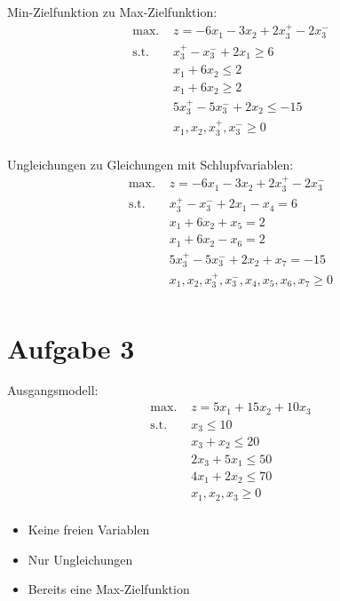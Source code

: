 \documentclass[a4paper,11pt]{article}
\begin{document}
Min-Zielfunktion zu Max-Zielfunktion:
\begin{align*}
    \text{max. } & z = -6x_{1} - 3x_{2} + 2x_{3}^{+} - 2x_{3}^{-}\\
    \text{s.t. } & x_{3}^{+} - x_{3}^{-} + 2x_{1} \ge 6 \\
    & x_{1} + 6x_{2} \le 2 \\
    & x_{1} + 6x_{2} \ge 2 \\
    & 5x_{3}^{+} - 5x_{3}^{-} + 2x_{2} \le -15 \\
    & x_{1}, x_{2}, x_{3}^{+}, x_{3}^{-} \ge 0 \\
\end{align*}

Ungleichungen zu Gleichungen mit Schlupfvariablen:
\begin{align*}
    \text{max. } & z = -6x_{1} - 3x_{2} + 2x_{3}^{+} - 2x_{3}^{-}\\
    \text{s.t. } & x_{3}^{+} - x_{3}^{-} + 2x_{1} - x_{4} = 6 \\
    & x_{1} + 6x_{2} + x_{5} = 2 \\
    & x_{1} + 6x_{2} - x_{6} = 2 \\
    & 5x_{3}^{+} - 5x_{3}^{-} + 2x_{2} + x_{7} = -15 \\
    & x_{1}, x_{2}, x_{3}^{+}, x_{3}^{-}, x_{4}, x_{5}, x_{6}, x_{7} \ge 0 \\
\end{align*}

\section*{Aufgabe 3}
Ausgangsmodell:
\begin{align*}
    \text{max. } & z = 5x_{1} + 15x_{2} + 10x_{3} \\
    \text{s.t. } & x_{3} \le 10 \\
    & x_{3} + x_{2} \le 20 \\
    & 2x_{3} + 5x_{1} \le 50 \\
    & 4x_{1} + 2x_{2} \le 70 \\
    & x_{1}, x_{2}, x_{3} \ge 0 \\
\end{align*}

\begin{itemize}
    \item Keine freien Variablen
    \item Nur Ungleichungen
    \item Bereits eine Max-Zielfunktion
\end{itemize}
\end{document}
